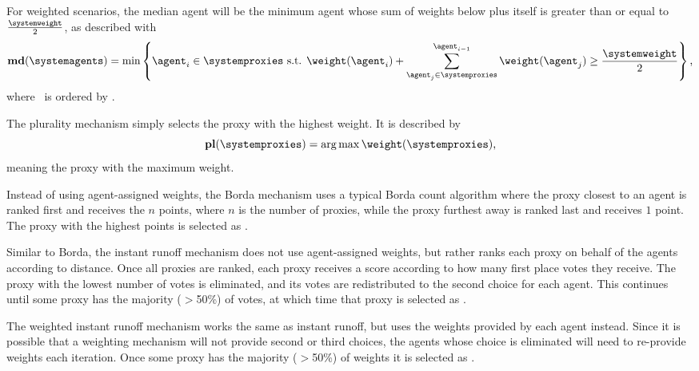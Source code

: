 For weighted scenarios, the median agent will be the minimum agent whose sum of
weights below plus itself is greater than or equal to $\frac{\systemweight}{2}$,
as described with
\begin{equation}
    \textbf{md}(\systemagents) = \min\left\{
    \agent_i \in \systemproxies \text{ s.t. }
    \weightof{\agent_i} +
    \sum_{\agent_j \in \systemproxies}^{\agent_{i - 1}} \weightof{\agent_j}
    \geq \frac{\systemweight}{2}
    \right\}
    \text{,}\label{eq:median-mechanism}
\end{equation}
where \systemproxies\ is ordered by \agenttruth.

The plurality mechanism simply selects the proxy with the highest weight.
It is described by
\begin{equation}
    \textbf{pl}(\systemproxies) =
    \argmax \weightof{\systemproxies}
    \text{,}\label{eq:plurality-mechanism}
\end{equation}
meaning the proxy with the maximum weight.

\label{para:candidate-borda}
Instead of using agent-assigned weights, the Borda mechanism uses a typical
Borda count algorithm where the proxy closest to an agent is ranked first and
receives the $n$ points, where $n$ is the number of proxies, while the proxy
furthest away is ranked last and receives $1$ point.
The proxy with the highest points is selected as \systemtruth.

\label{para:candidate-instant-runoff}
Similar to Borda, the instant runoff mechanism does not use agent-assigned
weights, but rather ranks each proxy on behalf of the agents according to
distance.
Once all proxies are ranked, each proxy receives a score according to how
many first place votes they receive.
The proxy with the lowest number of votes is eliminated, and its votes are
redistributed to the second choice for each agent.
This continues until some proxy has the majority ($>$50\%) of votes, at which
time that proxy is selected as \systemtruth.

\label{para:candidate-weighted-instant-runoff}
The weighted instant runoff mechanism works the same as instant runoff, but uses
the weights provided by each agent instead.
Since it is possible that a weighting mechanism will not provide second or
third choices, the agents whose choice is eliminated will need to
re-provide weights each iteration.
Once some proxy has the majority ($>$50\%) of weights it is selected as
\systemtruth.

